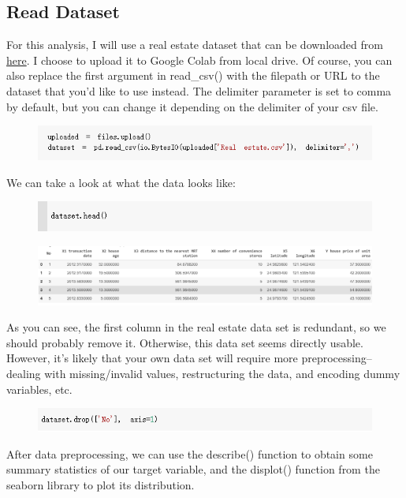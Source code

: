 \documentclass{article}
\begin{document}
\subsection*{Read Dataset}
For this analysis, I will use a real estate dataset that can be downloaded from \href{https://www.kaggle.com/quantbruce/real-estate-price-prediction}{here}. I choose to upload it to Google Colab from local drive. Of course, you can also replace the first argument in read\_csv() with the filepath or URL to the dataset that you'd like to use instead. The delimiter parameter is set to comma by default, but you can change it depending on the delimiter of your csv file.
\begin{figure}[H]\includegraphics[width=\linewidth]{2}\end{figure}
We can take a look at what the data looks like:
\begin{figure}[H]\includegraphics[width=\linewidth]{3}\end{figure}
\begin{figure}[H]\includegraphics[width=\linewidth]{4}\end{figure}
As you can see, the first column in the real estate data set is redundant, so we should probably remove it. Otherwise, this data set seems directly usable. However, it's likely that your own data set will require more preprocessing--dealing with missing/invalid values, restructuring the data, and encoding dummy variables, etc.
\begin{figure}[H]\includegraphics[width=\linewidth]{5}\end{figure}
After data preprocessing, we can use the describe() function to obtain some summary statistics of our target variable, and the displot() function from the seaborn library to plot its distribution.
\end{document}
